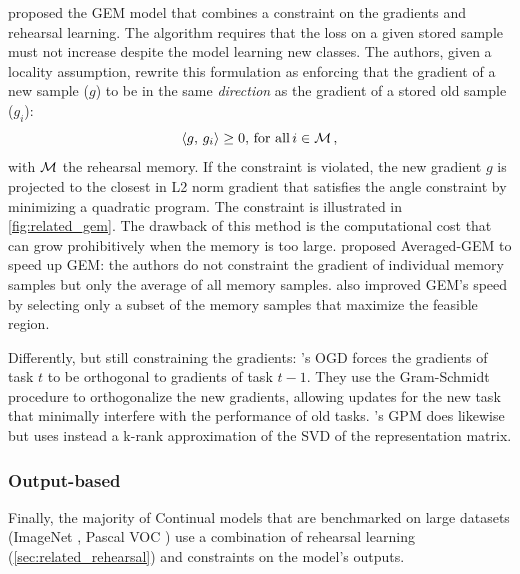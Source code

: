 \cite{lopezpaz2017gem} proposed the GEM model that combines a constraint on the gradients and
rehearsal learning. The algorithm requires that the loss on a given stored sample must not increase
despite the model learning new classes. The authors, given a locality assumption, rewrite this
formulation as enforcing that the gradient of a new sample ($g$) to be in the same \textit{direction} as
the gradient of a stored old sample ($g_i$):
%
\begin{equation}
      \langle g,\, g_i\rangle \ge 0,\, \text{for all}\, i \in \mathcal{M}\,,
\end{equation}
%
\noindent with $\mathcal{M}$ the rehearsal memory. If the constraint is violated, the new gradient $g$ is
projected to the closest in L2 norm gradient that satisfies the angle constraint by minimizing a
quadratic program. The constraint is illustrated in \autoref{fig:related_gem}. The drawback of this
method is the computational cost that can grow prohibitively when the memory is too large.
\cite{chaudhry2019AGEM} proposed Averaged-GEM to speed up GEM: the authors do not constraint the
gradient of individual memory samples but only the average of all memory samples.
\cite{aljundi2019gradientselection} also improved GEM's speed by selecting only a subset of the
memory samples that maximize the feasible region.

Differently, but still constraining the gradients: \cite{farajtabar2020ogd}'s OGD forces the gradients of
task $t$ to be orthogonal to gradients of task $t-1$. They use the Gram-Schmidt procedure to
orthogonalize the new gradients, allowing updates for the new task that minimally interfere with the
performance of old tasks. \cite{saha2021gpm}'s GPM does likewise but uses instead a k-rank
approximation of the SVD of the representation matrix.


\subsubsection{Output-based}
\label{sec:related_regul_output}

Finally, the majority of Continual models that are benchmarked on large datasets (\eg ImageNet
\citep{deng2009imagenet}, Pascal VOC \citep{everingham2015pascalvoc}) use a combination of rehearsal
learning (\autoref{sec:related_rehearsal}) and constraints on the model's outputs.

